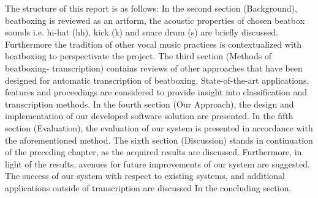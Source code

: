 The structure of this report is as follows: In the second section (Background), beatboxing is reviewed as an artform, the acoustic properties of chosen beatbox sounds i.e. hi-hat (hh), kick (k) and snare drum (s) are briefly discussed. Furthermore the tradition of other vocal music practices is contextualized with beatboxing to perspectivate the project. The third section (Methods of beatboxing- transcription) contains reviews of other approaches that have been designed for automatic transcription of beatboxing. State-of-the-art applications, features and proceedings are considered to provide insight into classification and transcription methods. In the fourth section (Our Approach), the design and implementation of our developed software solution are presented. In the fifth section (Evaluation), the evaluation of our system is presented in accordance with the aforementioned method. The sixth section (Discussion) stands in continuation of the preceding chapter, as the acquired results are discussed. Furthermore, in light of the results, avenues for future improvements of our system are suggested. The success of our system with respect to existing systems, and additional applications outside of transcription are discussed In the concluding section.